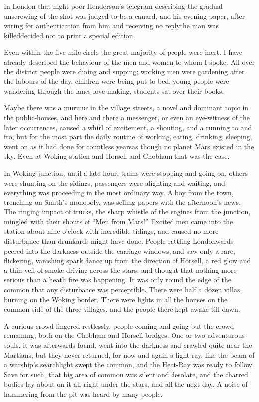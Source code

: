 In London that night poor Henderson's telegram describing the
gradual unscrewing of the shot was judged to be a canard, and his
evening paper, after wiring for authentication from him and
receiving no reply\dash{}the man was killed\dash{}decided not to print a
special edition.

Even within the five-mile circle the great majority of people were
inert. I have already described the behaviour of the men and women
to whom I spoke. All over the district people were dining and
supping; working men were gardening after the labours of the day,
children were being put to bed, young people were wandering through
the lanes love-making, students sat over their books.

Maybe there was a murmur in the village streets, a novel and
dominant topic in the public-houses, and here and there a
messenger, or even an eye-witness of the later occurrences, caused
a whirl of excitement, a shouting, and a running to and fro; but
for the most part the daily routine of working, eating, drinking,
sleeping, went on as it had done for countless years\dash{}as though no
planet Mars existed in the sky. Even at Woking station and Horsell
and Chobham that was the case.

In Woking junction, until a late hour, trains were stopping and
going on, others were shunting on the sidings, passengers were
alighting and waiting, and everything was proceeding in the most
ordinary way. A boy from the town, trenching on Smith's monopoly,
was selling papers with the afternoon's news. The ringing impact of
trucks, the sharp whistle of the engines from the junction, mingled
with their shouts of ``Men from Mars!'' Excited men came into the
station about nine o'clock with incredible tidings, and caused no
more disturbance than drunkards might have done. People rattling
Londonwards peered into the darkness outside the carriage windows,
and saw only a rare, flickering, vanishing spark dance up from the
direction of Horsell, a red glow and a thin veil of smoke driving
across the stars, and thought that nothing more serious than a
heath fire was happening. It was only round the edge of the common
that any disturbance was perceptible. There were half a dozen
villas burning on the Woking border. There were lights in all the
houses on the common side of the three villages, and the people
there kept awake till dawn.

A curious crowd lingered restlessly, people coming and going but
the crowd remaining, both on the Chobham and Horsell bridges. One
or two adventurous souls, it was afterwards found, went into the
darkness and crawled quite near the Martians; but they never
returned, for now and again a light-ray, like the beam of a
warship's searchlight swept the common, and the Heat-Ray was ready
to follow. Save for such, that big area of common was silent and
desolate, and the charred bodies lay about on it all night under
the stars, and all the next day. A noise of hammering from the pit
was heard by many people.

